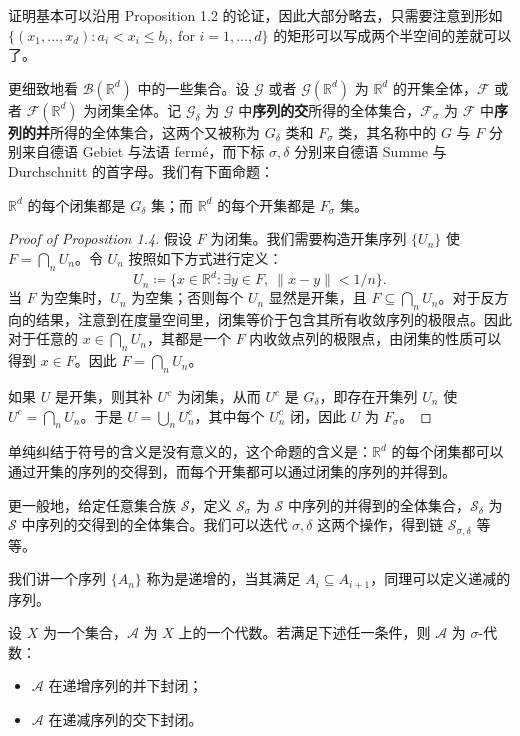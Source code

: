 \documentclass[11pt]{article}
\newcommand{\RR}{\mathbb{R}}
\newcommand{\calA}{\mathcal{A}}
\newcommand{\calB}{\mathcal{B}}
\newcommand{\calF}{\mathcal{F}}
\newcommand{\calG}{\mathcal{G}}
\begin{document}
证明基本可以沿用 Proposition 1.2 的论证，因此大部分略去，只需要注意到形如 $\{(x_1,\dots,x_d): a_i < x_i \le b_i,\ \text{for } i = 1,\dots,d\}$ 的矩形可以写成两个半空间的差就可以了。

更细致地看 $\calB(\RR^d)$ 中的一些集合。设 $\calG$ 或者 $\calG(\RR^d)$ 为 $\RR^d$ 的开集全体，$\calF$ 或者 $\calF(\RR^d)$ 为闭集全体。记 $\calG_\delta$ 为 $\calG$ 中{\normalfont\bfseries 序列的交}所得的全体集合，$\calF_\sigma$ 为 $\calF$ 中{\normalfont\bfseries 序列的并}所得的全体集合，这两个又被称为 $G_\delta$ 类和 $F_\sigma$ 类，其名称中的 $G$ 与 $F$ 分别来自德语 Gebiet 与法语 ferm\'e，而下标 $\sigma,\delta$ 分别来自德语 Summe 与 Durchschnitt 的首字母。我们有下面命题：

\begin{proposition}
    $\RR^d$ 的每个闭集都是 $G_\delta$ 集；而 $\RR^d$ 的每个开集都是 $F_\sigma$ 集。
\end{proposition}

\begin{proof}[Proof of Proposition 1.4]
    假设 $F$ 为闭集。我们需要构造开集序列 $\{U_n\}$ 使 $F = \bigcap_n U_n$。令 $U_n$ 按照如下方式进行定义：
    \[
        U_n \coloneqq \{x \in \RR^d : \exists y \in F,\ \|x-y\| < 1/n\}.
    \]
    当 $F$ 为空集时，$U_n$ 为空集；否则每个 $U_n$ 显然是开集，且 $F \subseteq \bigcap_n U_n$。对于反方向的结果，注意到在度量空间里，闭集等价于包含其所有收敛序列的极限点。因此对于任意的 $x \in \bigcap_n U_n$，其都是一个 $F$ 内收敛点列的极限点，由闭集的性质可以得到 $x \in F$。因此 $F = \bigcap_n U_n$。

    如果 $U$ 是开集，则其补 $U^c$ 为闭集，从而 $U^c$ 是 $G_\delta$，即存在开集列 $U_n$ 使 $U^c = \bigcap_n U_n$。于是 $U = \bigcup_n U_n^c$，其中每个 $U_n^c$ 闭，因此 $U$ 为 $F_\sigma$。
\end{proof}

单纯纠结于符号的含义是没有意义的，这个命题的含义是：$\RR^d$ 的每个闭集都可以通过开集的序列的交得到，而每个开集都可以通过闭集的序列的并得到。

更一般地，给定任意集合族 $\mathcal{S}$，定义 $\mathcal{S}_\sigma$ 为 $\mathcal{S}$ 中序列的并得到的全体集合，$\mathcal{S}_\delta$ 为 $\mathcal{S}$ 中序列的交得到的全体集合。我们可以迭代 $\sigma,\delta$ 这两个操作，得到链 $\mathcal{S}_{\sigma,\delta}$ 等等。

我们讲一个序列 $\{A_n\}$ 称为是递增的，当其满足 $A_i \subseteq A_{i+1}$，同理可以定义递减的序列。

\begin{proposition}
    设 $X$ 为一个集合，$\calA$ 为 $X$ 上的一个代数。若满足下述任一条件，则 $\calA$ 为 $\sigma$-代数：
    \begin{itemize}
        \item $\calA$ 在递增序列的并下封闭；
        \item $\calA$ 在递减序列的交下封闭。
    \end{itemize}
\end{proposition}
\end{document}
